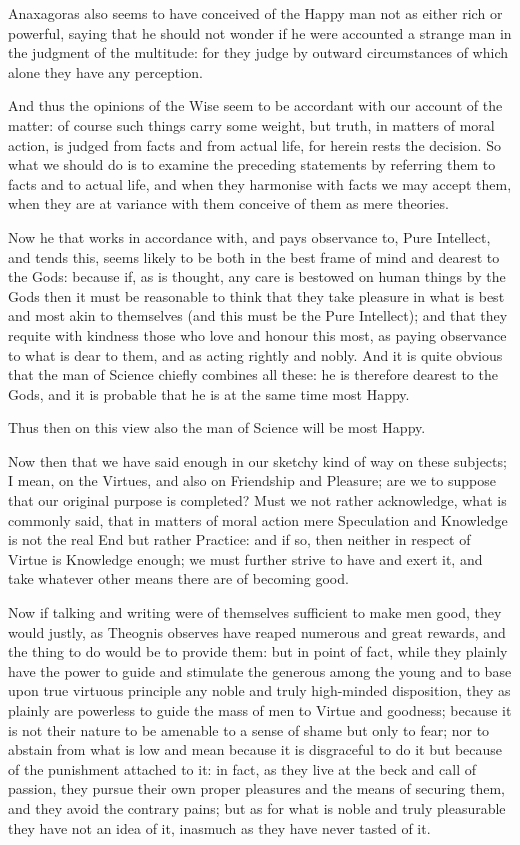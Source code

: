 Anaxagoras also seems to have conceived of the Happy man not as either rich or
powerful, saying that he should not wonder if he were accounted a strange man
in the judgment of the multitude: for they judge by outward circumstances of
which alone they have any perception.

And thus the opinions of the Wise seem to be accordant with our account of the
matter: of course such things carry some weight, but truth, in matters of moral
action, is judged from facts and from actual life, for herein rests the
decision. So what we should do is to examine the preceding statements by
referring them to facts and to actual life, and when they harmonise with facts
we may accept them, when they are at variance with them conceive of them as
mere theories.

Now he that works in accordance with, and pays observance to, Pure Intellect,
and tends this, seems likely to be both in the best frame of mind and dearest
to the Gods: because if, as is thought, any care is bestowed on human things by
the Gods then it must be reasonable to think that they take pleasure in what is
best and most akin to themselves (and this must be the Pure Intellect); and
that they requite with kindness those who love and honour this most, as paying
observance to what is dear to them, and as acting rightly and nobly. And it is
quite obvious that the man of Science chiefly combines all these: he is
therefore dearest to the Gods, and it is probable that he is at the same time
most Happy.

Thus then on this view also the man of Science will be most Happy.


Now then that we have said enough in our sketchy kind of way on these subjects;
I mean, on the Virtues, and also on Friendship and Pleasure; are we to suppose
that our original purpose is completed? Must we not rather acknowledge, what is
commonly said, that in matters of moral action mere Speculation and Knowledge
is not the real End but rather Practice: and if so, then neither in respect of
Virtue is Knowledge enough; we must further strive to have and exert it, and
take whatever other means there are of becoming good.

Now if talking and writing were of themselves sufficient to make men good, they
would justly, as Theognis observes have reaped numerous and great rewards, and
the thing to do would be to provide them: but in point of fact, while they
plainly have the power to guide and stimulate the generous among the young and
to base upon true virtuous principle any noble and truly high-minded
disposition, they as plainly are powerless to guide the mass of men to Virtue
and goodness; because it is not their nature to be amenable to a sense of shame
but only to fear; nor to abstain from what is low and mean because it is
disgraceful to do it but because of the punishment attached to it: in fact, as
they live at the beck and call of passion, they pursue their own proper
pleasures and the means of securing them, and they avoid the contrary pains;
but as for what is noble and truly pleasurable they have not an idea of it,
inasmuch as they have never tasted of it.

